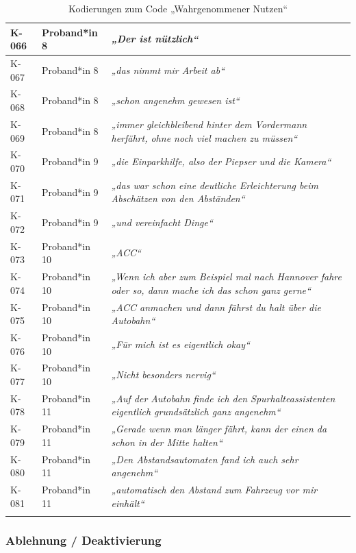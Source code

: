 {\begin{xltabular}{\textwidth}{
    |P{0.10\textwidth}
    |P{0.17\textwidth}
    |Y|
}
\hline
K-066 & Proband*in 8 & \textit{„Der ist nützlich“} \\
\hline
K-067 & Proband*in 8 & \textit{„das nimmt mir Arbeit ab“} \\
\hline
K-068 & Proband*in 8 & \textit{„schon angenehm gewesen ist“} \\
\hline
K-069 & Proband*in 8 & \textit{„immer gleichbleibend hinter dem Vordermann herfährt, ohne noch viel machen zu müssen“} \\
\hline
K-070 & Proband*in 9 & \textit{„die Einparkhilfe, also der Piepser und die Kamera“} \\
\hline
K-071 & Proband*in 9 & \textit{„das war schon eine deutliche Erleichterung beim Abschätzen von den Abständen“} \\
\hline
K-072 & Proband*in 9 & \textit{„und vereinfacht Dinge“} \\
\hline
K-073 & Proband*in 10 & \textit{„ACC“} \\
\hline
K-074 & Proband*in 10 & \textit{„Wenn ich aber zum Beispiel mal nach Hannover fahre oder so, dann mache ich das schon ganz gerne“} \\
\hline
K-075 & Proband*in 10 & \textit{„ACC anmachen und dann fährst du halt über die Autobahn“} \\
\hline
K-076 & Proband*in 10 & \textit{„Für mich ist es eigentlich okay“} \\
\hline
K-077 & Proband*in 10 & \textit{„Nicht besonders nervig“} \\
\hline
K-078 & Proband*in 11 & \textit{„Auf der Autobahn finde ich den Spurhalteassistenten eigentlich grundsätzlich ganz angenehm“} \\
\hline
K-079 & Proband*in 11 & \textit{„Gerade wenn man länger fährt, kann der einen da schon in der Mitte halten“} \\
\hline
K-080 & Proband*in 11 & \textit{„Den Abstandsautomaten fand ich auch sehr angenehm“} \\
\hline
K-081 & Proband*in 11 & \textit{„automatisch den Abstand zum Fahrzeug vor mir einhält“} \\
\hline
\caption{Kodierungen zum Code „Wahrgenommener Nutzen“}\label{tab:kodiernachweis-wahrgenommener-nutzen}\\
\end{xltabular}
}

\clearpage
\subsubsection{Ablehnung / Deaktivierung}

